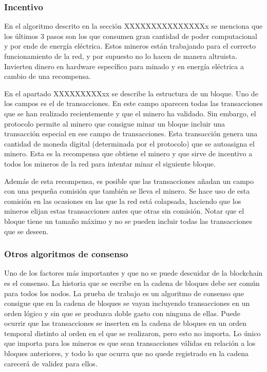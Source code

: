 \subsubsection{Incentivo}

En el algoritmo descrito en la sección XXXXXXXXXXXXXXXx se menciona que los últimos 3 pasos son los que consumen gran cantidad de poder computacional y por ende de energía eléctrica. Estos mineros están trabajando para el correcto funcionamiento de la red, y por supuesto no lo hacen de manera altruista. Invierten dinero en hardware específico para minado y en energía eléctrica a cambio de una recompensa. \newline

En el apartado XXXXXXXXXxx se describe la estructura de un bloque. Uno de los campos es el de transacciones. En este campo aparecen todas las transacciones que se han realizado recientemente y que el minero ha validado. Sin embargo, el protocolo permite al minero que consigue minar un bloque incluir una transacción especial en ese campo de transacciones. Esta transacción genera una cantidad de moneda digital (determinada por el protocolo) que se autoasigna el minero. Esta es la recompensa que obtiene el minero y que sirve de incentivo a todos los mineros de la red para intentar minar el siguiente bloque. \newline

Además de esta recompensa, es posible que las transacciones añadan un campo con una pequeña comisión que también se lleva el minero. Se hace uso de esta comisión en las ocasiones en las que la red está colapsada, haciendo que los mineros elijan estas transacciones antes que otras sin comisión. Notar que el bloque tiene un tamaño máximo y no se pueden incluir todas las transacciones que se deseen.


\subsubsection{Otros algoritmos de consenso}

Uno de los factores más importantes y que no se puede descuidar de la blockchain es el consenso. La historia que se escribe en la cadena de bloques debe ser común para todos los nodos. La prueba de trabajo es un algoritmo de consenso que consigue que en la cadena de bloques se vayan incluyendo transacciones en un orden lógico y sin que se produzca doble gasto con ninguna de ellas. Puede ocurrir que las transacciones se inserten en la cadena de bloques en un orden temporal distinto al orden en el que se realizaron, pero esto no importa. Lo único que importa para los mineros es que sean transacciones válidas en relación a los bloques anteriores, y todo lo que ocurra que no quede registrado en la cadena carecerá de validez para ellos. \newline

